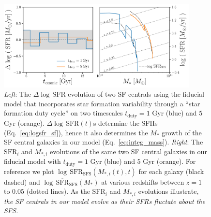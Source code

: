 \documentclass[12pt, letterpaper, preprint, tighten]{aastex}
\newcommand{\logsfr}{\log \, \mathrm{SFR}}
\newcommand{\musfms}{\log\,\overline{\mathrm{SFR}}_\mathrm{SFS}}
\begin{document}
\begin{figure}
\begin{center}
\includegraphics[width=0.9\textwidth]{figs/sfh_pedagogical.pdf}
    \caption{\emph{Left}: The $\Delta \logsfr$ evolution of two SF centrals
    using the fiducial model that incorporates star formation variability through 
    a ``star formation duty cycle'' on two timescales $t_\mathrm{duty} = 1$ Gyr 
    (blue) and $5$ Gyr (orange). $\Delta \logsfr(t)$s determine the SFHs
    (Eq.~\ref{eq:logsfr_sf}), hence it also determines the $M_*$ growth 
    of the SF central galaxies in our model (Eq.~\ref{eq:integ_mass}).  
    \emph{Right}: The $\mathrm{SFR}_i$ and $M_{*,i}$ evolutions of the same two 
    SF central galaxies in our fiducial model with $t_\mathrm{duty} = 1$ Gyr (blue) 
    and $5$ Gyr (orange). For reference we plot $\musfms(M_{*,i}(t), t)$ for 
    each galaxy (black dashed) and $\musfms(M_*)$ at various redshifts between 
    $z = 1$ to $0.05$ (dotted lines). As the $\mathrm{SFR}_i$ and $M_{*,i}$ 
    evolutions illustrate, \emph{the SF centrals in our model evolve as their SFRs 
    fluctate about the SFS.}} \label{fig:sfh_model}
\end{center}
\end{figure}
\end{document}
